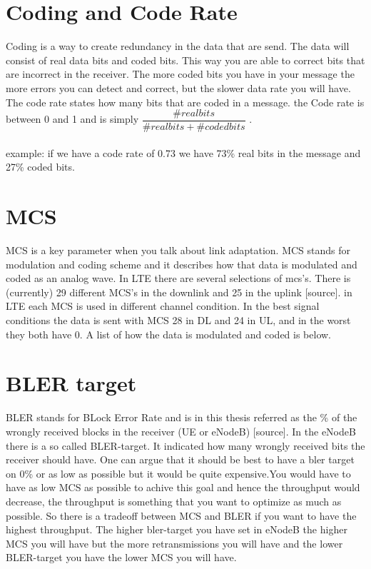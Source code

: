 \documentclass[cropmarks, frame, english]{idamasterthesis}
\begin{document}
\section{Coding and Code Rate}
Coding is a way to create redundancy in the data that are send. The data will consist of real data bits and coded bits. This way you are able to correct bits that are incorrect in the receiver. The more coded bits you have in your message the more errors you can detect and correct, but the slower data rate you will have. The code rate states how many bits that are coded in a message. the Code rate is between 0 and 1 and is simply $\dfrac{\# real bits}{ \# real bits + \# coded bits}$ .
\\ \\
example: if we have a code rate of 0.73 we have 73\% real bits in the message and 27\% coded bits.


\section{MCS}
MCS is a key parameter when you talk about link adaptation. MCS stands for modulation and coding scheme and it describes how that data is modulated and coded as an analog wave. In LTE there are several selections of mcs's. There is (currently) 29 different MCS's in the downlink and 25 in the uplink [source]. in LTE each MCS is used in different channel condition. In the best signal conditions the data is sent with MCS 28 in DL and 24 in UL, and in the worst they both have 0. A list of how the data is modulated and coded is below.

\section{BLER target}
BLER stands for BLock Error Rate and is in this thesis referred as the \% of the wrongly received blocks in the receiver (UE or eNodeB) [source]. In the eNodeB there is a so called BLER-target. It indicated how many wrongly received bits the receiver should have. One can argue that it should be best to have a bler target on 0\% or as low as possible but it would be quite expensive.You would have to have as low MCS as possible to achive this goal and hence the throughput would decrease, the throughput is something that you want to optimize as much as possible. So there is a tradeoff between MCS and BLER if you want to have the highest throughput. The higher bler-target you have set in eNodeB the higher MCS you will have but the more retransmissions you will have and the lower BLER-target you have the lower MCS you will have.
\end{document}
